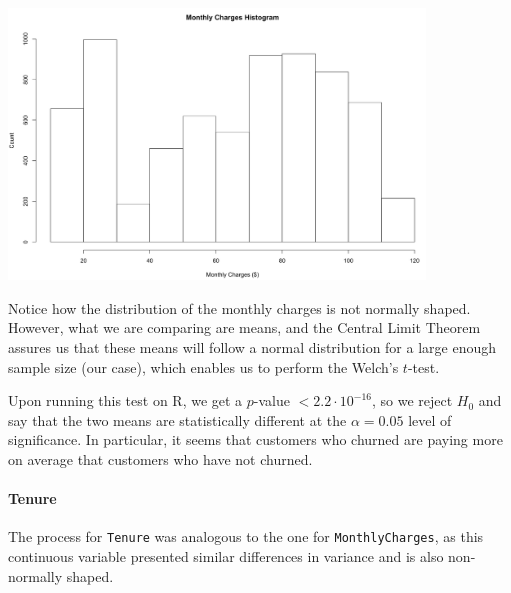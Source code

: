 \documentclass[man, floatsintext]{apa6}
\begin{document}
\noindent\begin{minipage}{0.54\textwidth}
\includegraphics[width = \linewidth, height = 72mm]{hist_MonthlyCharges}
\end{minipage}
\hfill
\begin{minipage}{0.43\textwidth} Notice how the distribution of the monthly charges is not normally shaped. However, what we are comparing are means, and the Central Limit Theorem assures us that these means will follow a normal distribution for a large enough sample size (our case), which enables us to perform the Welch's $t$-test. 
\end{minipage}

\hspace{0.5mm}

Upon running this test on R, we get a $p$-value $< 2.2 \cdot 10^{-16}$, so we reject $H_0$ and say that the two means are statistically different at the $\alpha = 0.05$ level of significance. In particular, it seems that customers who churned are paying more on average that customers who have not churned.

\paragraph{Tenure}

The process for \texttt{Tenure} was analogous to the one for \texttt{MonthlyCharges}, as this continuous variable presented similar differences in variance and is also non-normally shaped. 

\hspace{0.5mm}
\end{document}
